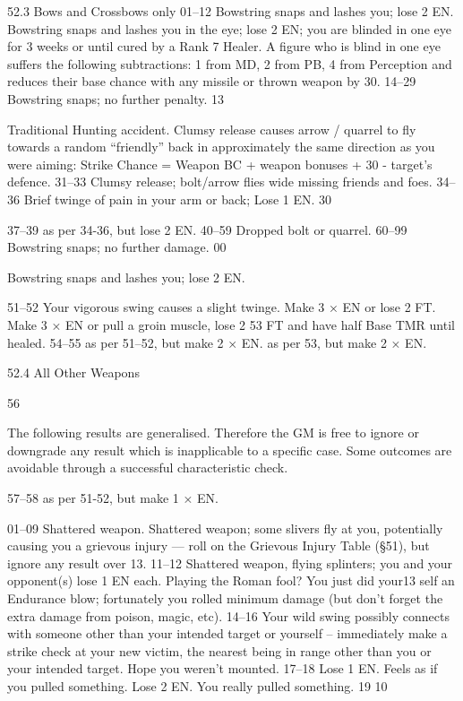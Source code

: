 \documentclass[a4paper]{article}
\begin{document}
\begin{multicols}{3}
52.3 Bows and Crossbows only
01–12 Bowstring snaps and lashes you; lose 2 EN.
Bowstring snaps and lashes you in the eye;
lose 2 EN; you are blinded in one eye for 3
weeks or until cured by a Rank 7 Healer. A
figure who is blind in one eye suffers the
following subtractions: 1 from MD, 2 from
PB, 4 from Perception and reduces their
base chance with any missile or thrown
weapon by 30.
14–29 Bowstring snaps; no further penalty.
13

Traditional Hunting accident. Clumsy release causes arrow / quarrel to fly towards a
random “friendly” back in approximately
the same direction as you were aiming:
Strike Chance = Weapon BC + weapon
bonuses + 30 - target’s defence.
31–33 Clumsy release; bolt/arrow flies wide missing friends and foes.
34–36 Brief twinge of pain in your arm or back;
Lose 1 EN.
30

37–39 as per 34-36, but lose 2 EN.
40–59 Dropped bolt or quarrel.
60–99 Bowstring snaps; no further damage.
00

Bowstring snaps and lashes you; lose 2 EN.

51–52 Your vigorous swing causes a slight twinge.
Make 3 × EN or lose 2 FT.
Make 3 × EN or pull a groin muscle, lose 2
53
FT and have half Base TMR until healed.
54–55 as per 51–52, but make 2 × EN.
as per 53, but make 2 × EN.

52.4 All Other Weapons

56

The following results are generalised. Therefore
the GM is free to ignore or downgrade any result
which is inapplicable to a specific case. Some
outcomes are avoidable through a successful characteristic check.

57–58 as per 51-52, but make 1 × EN.

01–09 Shattered weapon.
Shattered weapon; some slivers fly at you,
potentially causing you a grievous injury —
roll on the Grievous Injury Table (§51), but
ignore any result over 13.
11–12 Shattered weapon, flying splinters; you and
your opponent(s) lose 1 EN each.
Playing the Roman fool? You just did your13
self an Endurance blow; fortunately you
rolled minimum damage (but don’t forget
the extra damage from poison, magic, etc).
14–16 Your wild swing possibly connects with
someone other than your intended target or
yourself – immediately make a strike check
at your new victim, the nearest being in
range other than you or your intended target.
Hope you weren’t mounted.
17–18 Lose 1 EN. Feels as if you pulled something.
Lose 2 EN. You really pulled something.
19
10


\end{multicols}
\end{document}

